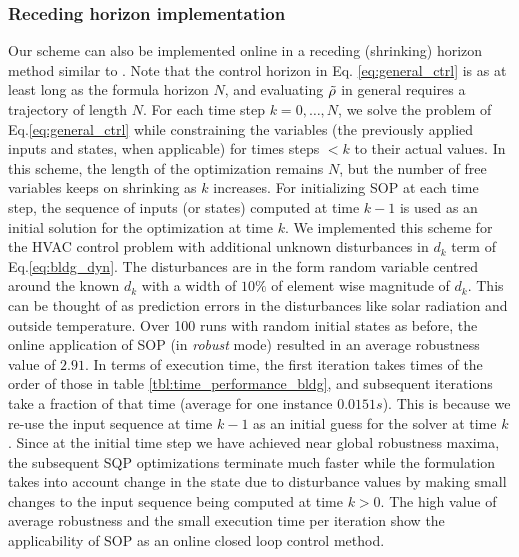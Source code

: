 

\subsubsection{Receding horizon implementation} 
\label{sec:online}
Our scheme can also be implemented online in a receding (shrinking) horizon method similar to \cite{Raman14_MPCSTL}. Note that the control horizon in Eq. \ref{eq:general_ctrl} is as at least long as the formula horizon $N$, and evaluating $\tilde{\rho}$ in general requires a trajectory of length $N$. 
For each time step $k=0,\dotsc,N$, we solve the problem of Eq.\ref{eq:general_ctrl} while constraining the variables (the previously applied inputs and states, when applicable) for times steps $<k$ to their actual values. In this scheme, the length of the optimization remains $N$, but the number of free variables keeps on shrinking as $k$ increases. For initializing SOP at each time step, the sequence of inputs (or states) computed at time $k-1$ is used as an initial solution for the optimization at time $k$. 
We implemented this scheme for the HVAC control problem with additional unknown disturbances in $d_k$ term of Eq.\ref{eq:bldg_dyn}.
The disturbances are in the form random variable centred around the known $d_k$ with a width of $10\%$ of element wise magnitude of $d_k$. This can be thought of as prediction errors in the disturbances like solar radiation and outside temperature. Over 100 runs with random initial states as before, the online application of SOP (in \textit{robust} mode) resulted in an average robustness value of $2.91$. In terms of execution time, the first iteration takes times of the order of those in table \ref{tbl:time_performance_bldg}, and subsequent iterations take a fraction of that time (average for one instance $0.0151s$). This is because we re-use the input sequence at time $k-1$ as an initial guess for the solver at time $k$. Since at the initial time step we have achieved near global robustness maxima, the subsequent SQP optimizations terminate much faster while the formulation takes into account change in the state due to disturbance values by making small changes to the input sequence being computed at time $k>0$. The high value of average robustness and the small execution time per iteration show the applicability of SOP as an online closed loop control method. 

